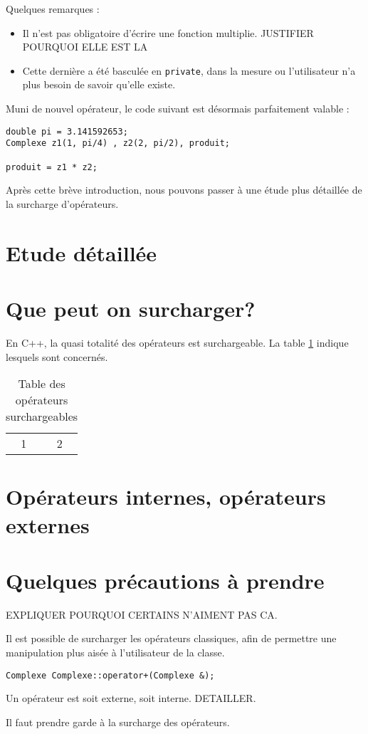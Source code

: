 Quelques remarques :
\begin{itemize}
\item Il n'est pas obligatoire d'\'ecrire une fonction multiplie. JUSTIFIER POURQUOI ELLE EST LA
\item Cette derni\`ere a \'et\'e bascul\'ee en \texttt{private}, dans la mesure ou l'utilisateur n'a plus besoin de savoir qu'elle existe.
\end{itemize}

Muni de nouvel op\'erateur, le code suivant est d\'esormais parfaitement valable :
\begin{lstlisting}
double pi = 3.141592653;
Complexe z1(1, pi/4) , z2(2, pi/2), produit;

produit = z1 * z2;
\end{lstlisting}

Apr\`es cette br\`eve introduction, nous pouvons passer \`a une \'etude plus d\'etaill\'ee de la surcharge d'op\'erateurs.

\section{Etude d\'etaill\'ee}

\section{Que peut on surcharger?}

En C++, la quasi totalit\'e des op\'erateurs est surchargeable. La table
\ref{tab:operateurs} indique lesquels sont concern\'es.


\begin{table}
	\centering
	\begin{tabular}{c c}
	 1 & 2 \\
	\end{tabular}
	\caption{Table des op\'erateurs surchargeables}
	\label{tab:operateurs}
\end{table}


\section{Op\'erateurs internes, op\'erateurs externes}

\section{Quelques pr\'ecautions \`a prendre}
EXPLIQUER POURQUOI CERTAINS N'AIMENT PAS CA.


\begin{recapitulatif}
\item Il est possible de surcharger les op\'erateurs classiques, afin de permettre une manipulation plus ais\'ee \`a l'utilisateur de la classe.
\begin{lstlisting}
Complexe Complexe::operator+(Complexe &);
\end{lstlisting}

\item Un op\'erateur est soit externe, soit interne. DETAILLER.
\item Il faut prendre garde \`a la surcharge des op\'erateurs.
\end{recapitulatif} 